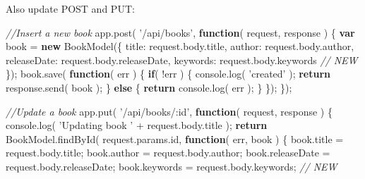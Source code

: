 \documentclass[9pt]{book}
\newenvironment{Shaded}{}{}
\newcommand{\KeywordTok}[1]{\textcolor[rgb]{0.00,0.44,0.13}{\textbf{{#1}}}}
\newcommand{\DataTypeTok}[1]{\textcolor[rgb]{0.56,0.13,0.00}{{#1}}}
\newcommand{\StringTok}[1]{\textcolor[rgb]{0.25,0.44,0.63}{{#1}}}
\newcommand{\CommentTok}[1]{\textcolor[rgb]{0.38,0.63,0.69}{\textit{{#1}}}}
\newcommand{\OtherTok}[1]{\textcolor[rgb]{0.00,0.44,0.13}{{#1}}}
\newcommand{\FunctionTok}[1]{\textcolor[rgb]{0.02,0.16,0.49}{{#1}}}
\newcommand{\NormalTok}[1]{{#1}}
\begin{document}
Also update POST and PUT:

\begin{Shaded}
\begin{Highlighting}[]
\CommentTok{//Insert a new book}
\OtherTok{app}\NormalTok{.}\FunctionTok{post}\NormalTok{( }\StringTok{'/api/books'}\NormalTok{, }\KeywordTok{function}\NormalTok{( request, response ) \{}
    \KeywordTok{var} \NormalTok{book = }\KeywordTok{new} \FunctionTok{BookModel}\NormalTok{(\{}
        \DataTypeTok{title}\NormalTok{: }\OtherTok{request}\NormalTok{.}\OtherTok{body}\NormalTok{.}\FunctionTok{title}\NormalTok{,}
        \DataTypeTok{author}\NormalTok{: }\OtherTok{request}\NormalTok{.}\OtherTok{body}\NormalTok{.}\FunctionTok{author}\NormalTok{,}
        \DataTypeTok{releaseDate}\NormalTok{: }\OtherTok{request}\NormalTok{.}\OtherTok{body}\NormalTok{.}\FunctionTok{releaseDate}\NormalTok{,}
        \DataTypeTok{keywords}\NormalTok{: }\OtherTok{request}\NormalTok{.}\OtherTok{body}\NormalTok{.}\FunctionTok{keywords}       \CommentTok{// NEW}
    \NormalTok{\});}
    \OtherTok{book}\NormalTok{.}\FunctionTok{save}\NormalTok{( }\KeywordTok{function}\NormalTok{( err ) \{}
        \KeywordTok{if}\NormalTok{( !err ) \{}
            \OtherTok{console}\NormalTok{.}\FunctionTok{log}\NormalTok{( }\StringTok{'created'} \NormalTok{);}
            \KeywordTok{return} \OtherTok{response}\NormalTok{.}\FunctionTok{send}\NormalTok{( book );}
        \NormalTok{\} }\KeywordTok{else} \NormalTok{\{}
            \KeywordTok{return} \OtherTok{console}\NormalTok{.}\FunctionTok{log}\NormalTok{( err );}
        \NormalTok{\}}
    \NormalTok{\});}
\NormalTok{\});}

\CommentTok{//Update a book}
\OtherTok{app}\NormalTok{.}\FunctionTok{put}\NormalTok{( }\StringTok{'/api/books/:id'}\NormalTok{, }\KeywordTok{function}\NormalTok{( request, response ) \{}
    \OtherTok{console}\NormalTok{.}\FunctionTok{log}\NormalTok{( }\StringTok{'Updating book '} \NormalTok{+ }\OtherTok{request}\NormalTok{.}\OtherTok{body}\NormalTok{.}\FunctionTok{title} \NormalTok{);}
    \KeywordTok{return} \OtherTok{BookModel}\NormalTok{.}\FunctionTok{findById}\NormalTok{( }\OtherTok{request}\NormalTok{.}\OtherTok{params}\NormalTok{.}\FunctionTok{id}\NormalTok{, }\KeywordTok{function}\NormalTok{( err, book ) \{}
        \OtherTok{book}\NormalTok{.}\FunctionTok{title} \NormalTok{= }\OtherTok{request}\NormalTok{.}\OtherTok{body}\NormalTok{.}\FunctionTok{title}\NormalTok{;}
        \OtherTok{book}\NormalTok{.}\FunctionTok{author} \NormalTok{= }\OtherTok{request}\NormalTok{.}\OtherTok{body}\NormalTok{.}\FunctionTok{author}\NormalTok{;}
        \OtherTok{book}\NormalTok{.}\FunctionTok{releaseDate} \NormalTok{= }\OtherTok{request}\NormalTok{.}\OtherTok{body}\NormalTok{.}\FunctionTok{releaseDate}\NormalTok{;}
        \OtherTok{book}\NormalTok{.}\FunctionTok{keywords} \NormalTok{= }\OtherTok{request}\NormalTok{.}\OtherTok{body}\NormalTok{.}\FunctionTok{keywords}\NormalTok{; }\CommentTok{// NEW}


\end{Highlighting}
\end{Shaded}
\end{document}
